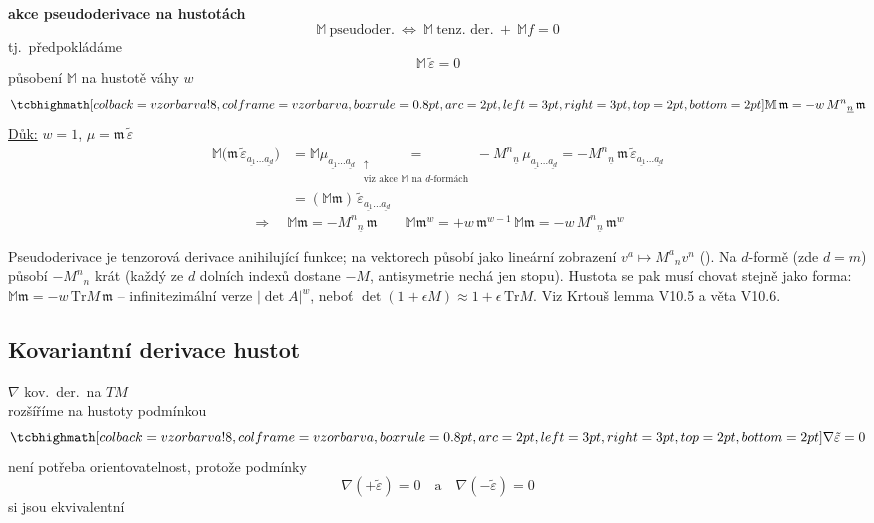 \textbf{akce pseudoderivace na hustotách}
\[
  \mathbb{M}\ \text{pseudoder.} \ \Leftrightarrow\ \mathbb{M}\ \text{tenz.\ der.} \ +\ \mathbb{M}f = 0
\]
tj.\ předpokládáme
\[
  \mathbb{M}\,\tilde\varepsilon = 0
\]
působení $\mathbb{M}$ na hustotě váhy $w$
\[
  \vzorec{\mathbb{M}\,\mathfrak{m} = -w\,M^{n}{}_{\underline n}\,\mathfrak{m}}
\]
\underline{Důk:} \quad $w = 1$, \quad $\mu = \mathfrak{m}\,\tilde\varepsilon$
\begin{align*}
  \mathbb{M}\big(\mathfrak{m}\,\tilde\varepsilon_{\underline{a_1}\dots\underline{a_d}}\big)
  &= \mathbb{M}\mu_{\underline{a_1}\dots\underline{a_d}}
  \underset{\substack{\uparrow\\\text{viz akce $\mathbb{M}$ na $d$-formách}}}{=}
  -M^{n}{}_{\underline n}\,\mu_{\underline{a_1}\dots\underline{a_d}}
  = -M^{n}{}_{\underline n}\,\mathfrak{m}\,\tilde\varepsilon_{\underline{a_1}\dots\underline{a_d}} \\
  &= (\mathbb{M}\mathfrak{m})\,\tilde\varepsilon_{\underline{a_1}\dots\underline{a_d}}
\end{align*}
\[
  \Rightarrow\quad \mathbb{M}\mathfrak{m} = -M^{n}{}_{\underline n}\,\mathfrak{m}
  \qquad
  \mathbb{M}\mathfrak{m}^w = +w\,\mathfrak{m}^{w-1}\,\mathbb{M}\mathfrak{m} = -w\,M^{n}{}_{\underline n}\,\mathfrak{m}^w
\]

\begin{vysvetleni}
Pseudoderivace je tenzorová derivace anihilující funkce; na vektorech působí jako lineární zobrazení $v^a\mapsto M^a{}_n v^n$
(). Na $d$-formě (zde $d=m$) působí $-M^n{}_n$ krát (každý ze $d$ dolních indexů dostane $-M$, antisymetrie nechá jen stopu).
Hustota se pak musí chovat stejně jako forma: $\mathbb M\mathfrak m = -w\,\mathrm{Tr}M\,\mathfrak m$ -- infinitezimální verze $|\det A|^w$,
neboť $\det(1+\epsilon M)\approx 1+\epsilon\,\mathrm{Tr}M$. Viz Krtouš lemma V10.5 a věta V10.6.
\end{vysvetleni}

\subsection{Kovariantní derivace hustot}

$\nabla$ kov.\ der.\ na $TM$ \\
rozšíříme na hustoty podmínkou
\[
  \vzorec{\nabla\tilde\varepsilon = 0}
\]
není potřeba orientovatelnost, protože podmínky
\[
  \nabla(+\tilde\varepsilon) = 0 \quad\text{a}\quad \nabla(-\tilde\varepsilon) = 0
\]
si jsou ekvivalentní

